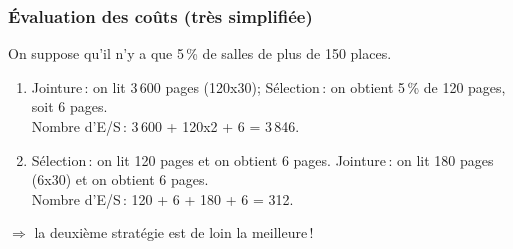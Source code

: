 \begin{frame}
\frametitle{\'Evaluation des co\^uts (très simplifiée)}

On suppose qu'il n'y a que 5\,\% de salles de plus de 150
places.

\begin{enumerate}
\item Jointure\,: on
lit 3\,600 pages (120x30); Sélection\,: on obtient 5\,\% de 120 pages, 
soit 6 pages.\\ 

Nombre d'E/S\,: 3\,600 + 120x2 + 6 = 3\,846.

\item S\'election\,: on lit 120 pages et on
obtient 6 pages. Jointure\,:
on lit 180 pages (6x30) et on obtient 6 pages.\\
Nombre d'E/S\,: 120 + 6 + 180 + 6 = 312.
\end{enumerate}

$\Rightarrow$ la deuxième strat\'egie est de loin la meilleure\,!
\end{frame}

